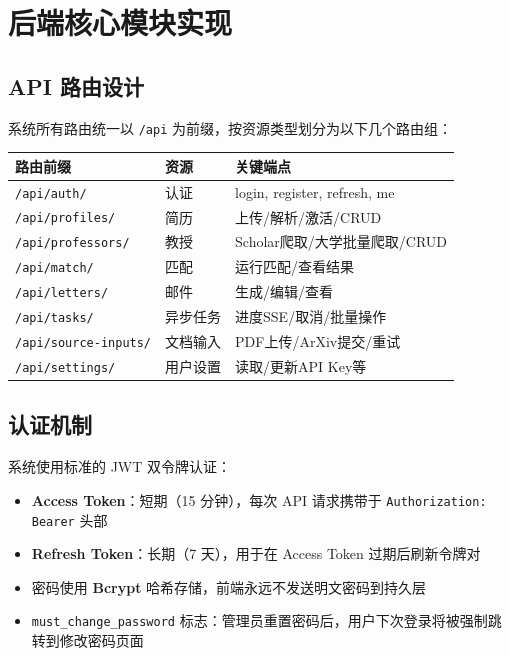 \documentclass[11pt]{article}
\begin{document}
\section{后端核心模块实现}

\subsection{API 路由设计}

系统所有路由统一以 \texttt{/api} 为前缀，按资源类型划分为以下几个路由组：

\begin{center}
\begin{tabular}{|l|l|l|}
\hline
\textbf{路由前缀} & \textbf{资源} & \textbf{关键端点} \\
\hline
\texttt{/api/auth/} & 认证 & login, register, refresh, me \\
\texttt{/api/profiles/} & 简历 & 上传/解析/激活/CRUD \\
\texttt{/api/professors/} & 教授 & Scholar爬取/大学批量爬取/CRUD \\
\texttt{/api/match/} & 匹配 & 运行匹配/查看结果 \\
\texttt{/api/letters/} & 邮件 & 生成/编辑/查看 \\
\texttt{/api/tasks/} & 异步任务 & 进度SSE/取消/批量操作 \\
\texttt{/api/source-inputs/} & 文档输入 & PDF上传/ArXiv提交/重试 \\
\texttt{/api/settings/} & 用户设置 & 读取/更新API Key等 \\
\hline
\end{tabular}
\end{center}

\subsection{认证机制}

系统使用标准的 JWT 双令牌认证：

\begin{itemize}
    \item \textbf{Access Token}：短期（15 分钟），每次 API 请求携带于 \texttt{Authorization: Bearer} 头部
    \item \textbf{Refresh Token}：长期（7 天），用于在 Access Token 过期后刷新令牌对
    \item 密码使用 \textbf{Bcrypt} 哈希存储，前端永远不发送明文密码到持久层
    \item \texttt{must\_change\_password} 标志：管理员重置密码后，用户下次登录将被强制跳转到修改密码页面
\end{itemize}
\end{document}
